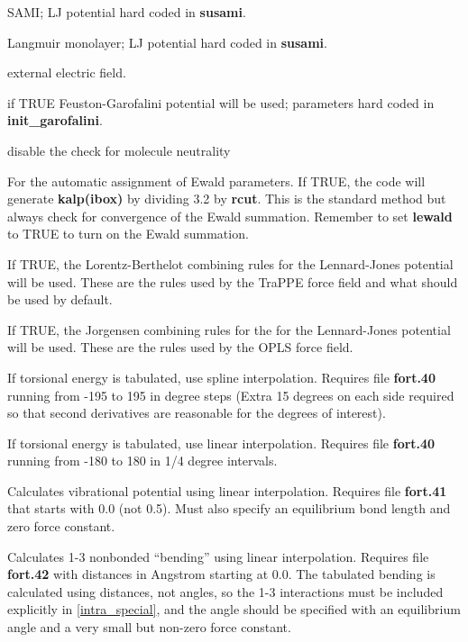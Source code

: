 \documentclass[12pt,letterpaper]{article}
\begin{document}
 SAMI; LJ potential hard coded in {\bf susami}.

 Langmuir monolayer; LJ potential hard coded in {\bf susami}.

 external electric field.

 if TRUE Feuston-Garofalini potential
will be used; parameters hard coded in
{\bf init\_garofalini}.

 disable the check for molecule neutrality

 For the automatic assignment
of Ewald parameters. If TRUE, the code will generate {\bf
  kalp(ibox)} by dividing 3.2 by {\bf rcut}. This is the
standard method but always check for convergence of the
Ewald summation. Remember to set {\bf lewald} to TRUE to
turn on the Ewald summation.

 If TRUE, the Lorentz-Berthelot
combining rules for the Lennard-Jones potential will be
used. These are the rules used by the TraPPE force field and
what should be used by default.

 If TRUE, the Jorgensen combining
rules for the for the Lennard-Jones potential will be used.
These are the rules used by the OPLS force field.

 If torsional energy is tabulated,
use spline interpolation. Requires file {\bf fort.40}
running from -195 to 195 in degree steps (Extra 15 degrees
on each side required so that second derivatives are
reasonable for the degrees of interest).

 If torsional energy is tabulated,
use linear interpolation. Requires file {\bf fort.40}
running from -180 to 180 in 1/4 degree intervals.

 Calculates vibrational
potential using linear interpolation. Requires file
{\bf fort.41} that starts with 0.0 (not 0.5). Must also specify
an equilibrium bond length and zero force constant.

 Calculates 1-3 nonbonded
``bending'' using linear interpolation. Requires file {\bf
  fort.42} with distances in Angstrom starting at 0.0. The
tabulated bending is calculated using distances, not angles,
so the 1-3 interactions must be included explicitly in
\ref{intra_special}, and the angle should be specified with
an equilibrium angle and a very small but non-zero force
constant.
\end{document}

